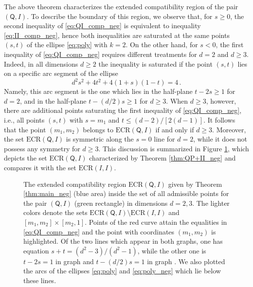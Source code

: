 \documentclass[12pt,reqno]{amsart}
\theoremstyle{definition}
\newcommand{\Qo}{\mathsf{Q}}%
\newcommand{\ECR}[1]{\textrm{ECR} #1} %
\begin{document}
The above theorem characterizes the extended compatibility region of the pair $(\Qo,I)$. To describe the boundary of this region, we observe that, for $s\geq 0$, the second inequality of \eqref{eq:QI_comp_neg} is equivalent to inequality \eqref{eq:II_comp_neg}, hence both inequalities are saturated at the same points $(s,t)$ of the ellipse \eqref{eq:poly} with $k=2$. On the other hand, for $s<0$, the first inequality of \eqref{eq:QI_comp_neg} requires different treatments for $d=2$ and $d\geq 3$. Indeed, in all dimensions $d\geq 2$ the inequality is saturated if the point $(s,t)$ lies on a specific arc segment of the ellipse
\begin{equation}\label{eq:poly_neg}
d^2 s^2 + 4 t^2 + 4 (1 + s) (1 - t) = 4 \,.
\end{equation}
Namely, this arc segment is the one which lies in the half-plane $t - 2 s \geq 1$ for $d=2$, and in the half-plane $t - (d/2)s \geq 1$ for $d\geq 3$. When $d\geq 3$, however, there are additional points saturating the first inequality of \eqref{eq:QI_comp_neg}, i.e., all points $(s,t)$ with $s=m_1$ and $t\leq (d - 2)/[2 (d - 1)]$. It follows that the point $(m_1,m_2)$ belongs to $\ECR{(\Qo,I)}$ if and only if $d\geq 3$. Moreover, the set $\ECR{(\Qo,I)}$ is symmetric along the $s=0$ line for $d=2$, while it does not possess any symmetry for $d\geq 3$. This discussion is summarized in Figure \ref{fig:comp_neg_QI}, which depicts the set $\ECR{(\Qo,I)}$ characterized by Theorem \ref{thm:QP+II_neg} and compares it with the set $\ECR{(I,I)}$.

\begin{figure}[h!]
\centering
{}
\caption{The extended compatibility region $\ECR{(\Qo,I)}$ given by Theorem \ref{thm:main_neg} (blue area) inside the set of all admissible points for the pair $(\Qo,I)$ (green rectangle) in dimensions $d=2,3$.
The lighter colors denote the sets $\ECR{(\Qo,I)}\setminus\ECR{(I,I)}$ and $[m_1,m_2]\times [m_2,1]$. Points of the red curve attain the equalities in \eqref{eq:QI_comp_neg} and the point with coordinates $(m_1,m_2)$ is highlighted. Of the two lines which appear in both graphs, one has equation $s+t=(d^2-3)/(d^2-1)$, while the other one is $t-2s=1$ in graph  and $t-(d/2)s=1$ in graph . We also plotted the arcs of the ellipses \eqref{eq:poly} and \eqref{eq:poly_neg} which lie below these lines.\label{fig:comp_neg_QI}}
\end{figure}
\end{document}
